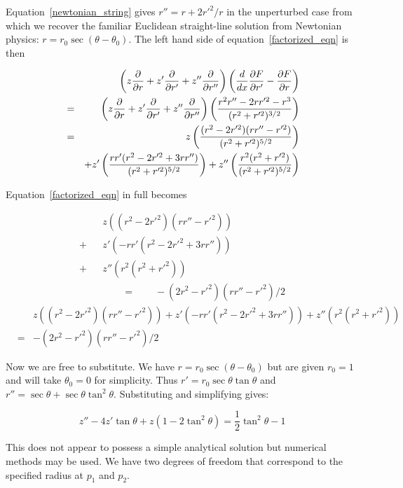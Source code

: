 \documentclass[pdflatex,sn-mathphys-num]{sn-jnl}%
\theoremstyle{thmstyleone}%
\theoremstyle{thmstyletwo}%
\theoremstyle{thmstylethree}%
\begin{document}
Equation~\ref{newtonian_string} gives $r'' = r + 2r'^2/r$ in the
unperturbed case from which we recover the familiar Euclidean
straight-line solution from Newtonian physics:
$r=r_0\sec(\theta-\theta_0)$.  The left hand side of
equation~\ref{factorized_eqn} is then

\begin{eqnarray}
&{}& \left(z\frac{\partial{}}{\partial{r}} + z'\frac{\partial{}}{\partial{r'}} + z''\frac{\partial{}}{\partial{r''}}\right)
\left(\frac{d}{dx}\frac{\partial{F}}{\partial{r'}}
-\frac{\partial{F}}{\partial{r}}\right)\nonumber\\
&=&  \left(z\frac{\partial{}}{\partial{r}} + z'\frac{\partial{}}{\partial{r'}} + z''\frac{\partial{}}{\partial{r''}}\right)
\left(\frac{r^2r''- 2rr'^2 -r^3}{(r^2 +r'^2)^{3/2}}\right)\nonumber\\
&=& 
 z  \left(\frac{(r^2 - 2r'^2)(rr''-r'^2)}{(r^2 + r'^2)^{5/2}}\right)\nonumber\\
 &{}& + z' \left(\frac{rr'(r^2 - 2r'^2 + 3rr'')}{(r^2 + r'^2)^{5/2}}\right)
      + z''\left(\frac{r^2    (r^2+r'^2)       }{(r^2 + r'^2)^{5/2}}\right)
\end{eqnarray}

Equation~\ref{factorized_eqn} in full becomes

\begin{eqnarray}
 &{}&z   \left((r^2 - 2r'^2)(rr''-r'^2)\right)\nonumber\\
+&{}&z'  \left(-rr'(r^2 - 2r'^2 + 3rr'')\right)\nonumber\\
+&{}&z'' \left(r^2    (r^2+r'^2)       \right)\nonumber\\
&{}&\qquad =\qquad -(2r^2-r'^2)(rr''-r'^2)/2
\end{eqnarray}
\begin{eqnarray}
  &{}&
  z   \left((r^2 - 2r'^2)(rr''-r'^2)\right)
  +z'  \left(-rr'(r^2 - 2r'^2 + 3rr'')\right)
  +z'' \left(r^2    (r^2+r'^2)       \right)\nonumber\\
 &=& -(2r^2-r'^2)(rr''-r'^2)/2
\end{eqnarray}

Now we are free to substitute.  We have $r=r_0\sec(\theta-\theta_0)$
but are given $r_0=1$ and will take $\theta_0=0$ for simplicity.  Thus
$r'= r_0\sec\theta\tan\theta$ and
$r''=\sec\theta+\sec\theta\tan^2\theta$.  Substituting and simplifying
gives:

\begin{equation}\label{string_ODE}
z'' - 4z'\tan \theta + z(1-2\tan^2\theta) = {\scriptstyle\frac{1}{2}}\tan^2\theta - 1
\end{equation}

This does not appear to possess a simple analytical solution but
numerical methods may be used.  We have two degrees of freedom that
correspond to the specified radius at $p_1$ and $p_2$.
\end{document}
